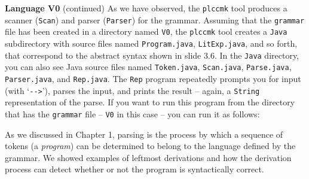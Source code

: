 \begin{minipage}[t]{\sw}
\slidenumber
\LARGE
{\bf Language V0} (continued)\exx
As we have observed, the \verb'plccmk' tool produces
a scanner (\verb'Scan')
and parser (\verb'Parser') for the grammar.\exx
Assuming that the \verb'grammar' file has been created
in a directory named \verb'V0',
the \verb'plccmk' tool creates a \verb'Java' subdirectory
with source files named \verb'Program.java',
\verb'LitExp.java', and so forth,
that correspond to the abstract syntax shown in slide 3.6.
In the \verb'Java' directory,
you can also see Java source files named \verb'Token.java',
\verb'Scan.java',
\verb'Parse.java',
\verb'Parser.java',
and \verb'Rep.java'.\exx
The \verb'Rep' program
repeatedly prompts you for input (with `\verb'-->''),
parses the input,
and prints the result --
again, a \verb'String' representation of the parse.
If you want to run this program
from the directory that has the \verb'grammar' file --
\verb'V0' in this case --
you can run it as follows:
\Large
{}
\LARGE
As we discussed in Chapter 1,
parsing is the process by which a sequence of tokens
(a {\em program}) can be determined
to belong to the language defined by the grammar.
We showed examples of leftmost derivations
and how the derivation process can detect whether or not
the program is syntactically correct.

\end{minipage}
